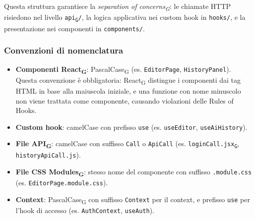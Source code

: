\documentclass[11pt,a4paper]{article}
\newcommand{\gls}[1]{#1\textsubscript{G}}
\begin{document}
Questa struttura garantisce la \textit{\gls{separation of concerns}}: le chiamate HTTP risiedono nel livello \texttt{\gls{api}/}, la logica applicativa nei custom hook in \texttt{hooks/}, e la presentazione nei componenti in \texttt{components/}.

\subsubsection{Convenzioni di nomenclatura}
\begin{itemize}
    \item \textbf{Componenti \gls{React}}: \gls{PascalCase} (es. \texttt{EditorPage}, \texttt{HistoryPanel}). Questa convenzione è obbligatoria: \gls{React} distingue i componenti dai tag HTML in base alla maiuscola iniziale, e una funzione con nome minuscolo non viene trattata come componente, causando violazioni delle Rules of Hooks.
    \item \textbf{Custom hook}: camelCase con prefisso \texttt{use} (es. \texttt{useEditor}, \texttt{useAiHistory}).
    \item \textbf{File \gls{API}}: camelCase con suffisso \texttt{Call} o \texttt{ApiCall} (es. \texttt{loginCall.\gls{jsx}}, \texttt{historyApiCall.js}).
    \item \textbf{File \gls{CSS Modules}}: stesso nome del componente con suffisso \texttt{.module.css} \\ (es. \texttt{EditorPage.module.css}).
    \item \textbf{Context}: \gls{PascalCase} con suffisso \texttt{Context} per il context, e prefisso \texttt{use} per l'hook di accesso (es. \texttt{AuthContext}, \texttt{useAuth}).
\end{itemize}
\end{document}

